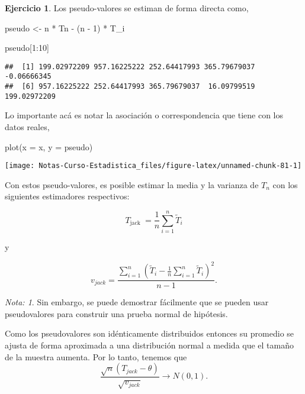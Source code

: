 \documentclass[
  12pt,
]{book}
\newenvironment{Shaded}{\begin{snugshade}}{\end{snugshade}}
\newcommand{\AttributeTok}[1]{\textcolor[rgb]{0.77,0.63,0.00}{#1}}
\newcommand{\DecValTok}[1]{\textcolor[rgb]{0.00,0.00,0.81}{#1}}
\newcommand{\FunctionTok}[1]{\textcolor[rgb]{0.00,0.00,0.00}{#1}}
\newcommand{\NormalTok}[1]{#1}
\newcommand{\OtherTok}[1]{\textcolor[rgb]{0.56,0.35,0.01}{#1}}
\newcommand{\SpecialCharTok}[1]{\textcolor[rgb]{0.00,0.00,0.00}{#1}}
\theoremstyle{definition}
\theoremstyle{definition}
\theoremstyle{definition}
\newtheorem{exercise}{Ejercicio}[chapter]
\theoremstyle{definition}
\theoremstyle{remark}
\newtheorem*{remark}{Nota: }
\begin{document}
\begin{exercise}
\protect\hypertarget{exr:unnamed-chunk-79}{}\label{exr:unnamed-chunk-79}Los pseudo-valores se estiman de forma directa como,
\end{exercise}

\begin{Shaded}
\begin{Highlighting}[]
\NormalTok{pseudo }\OtherTok{\textless{}{-}}\NormalTok{ n }\SpecialCharTok{*}\NormalTok{ Tn }\SpecialCharTok{{-}}\NormalTok{ (n }\SpecialCharTok{{-}} \DecValTok{1}\NormalTok{) }\SpecialCharTok{*}\NormalTok{ T\_i}

\NormalTok{pseudo[}\DecValTok{1}\SpecialCharTok{:}\DecValTok{10}\NormalTok{]}
\end{Highlighting}
\end{Shaded}

\begin{verbatim}
##  [1] 199.02972209 957.16225222 252.64417993 365.79679037  -0.06666345
##  [6] 957.16225222 252.64417993 365.79679037  16.09799519 199.02972209
\end{verbatim}

Lo importante acá es notar la asociación o correspondencia que tiene con los datos reales,

\begin{Shaded}
\begin{Highlighting}[]
\FunctionTok{plot}\NormalTok{(}\AttributeTok{x =}\NormalTok{ x, }\AttributeTok{y =}\NormalTok{ pseudo)}
\end{Highlighting}
\end{Shaded}

\begin{center}\texttt{[image: Notas-Curso-Estadistica\_files/figure-latex/unnamed-chunk-81-1]} \end{center}

Con estos pseudo-valores, es posible estimar la media y la varianza de
\(T_{n}\) con los siguientes estimadores respectivos:

\[
T_{\text {jack }}=\frac{1}{n} \sum_{i=1}^{n} \widetilde{T}_{i}
\]

y

\[
v_{jack}=\frac{\sum_{i=1}^{n}\left(\widetilde{T}_{i}-\frac{1}{n}
\sum_{i=1}^{n} \widetilde{T}_{i}\right)^{2}}{n-1}.
\]

\begin{remark}
Sin embargo, se puede demostrar fácilmente que se pueden usar
pseudovalores para construir una prueba normal de hipótesis.

Como los pseudovalores son idénticamente distribuidos entonces su promedio se ajusta de forma aproximada a una distribución normal a medida
que el tamaño de la muestra aumenta. Por lo tanto, tenemos que
\[
  \frac{\sqrt{n}\left(T_{jack}-\theta\right)}{\sqrt{v_{jack}}}
  \rightarrow N(0,1).
\]
\end{remark}
\end{document}
